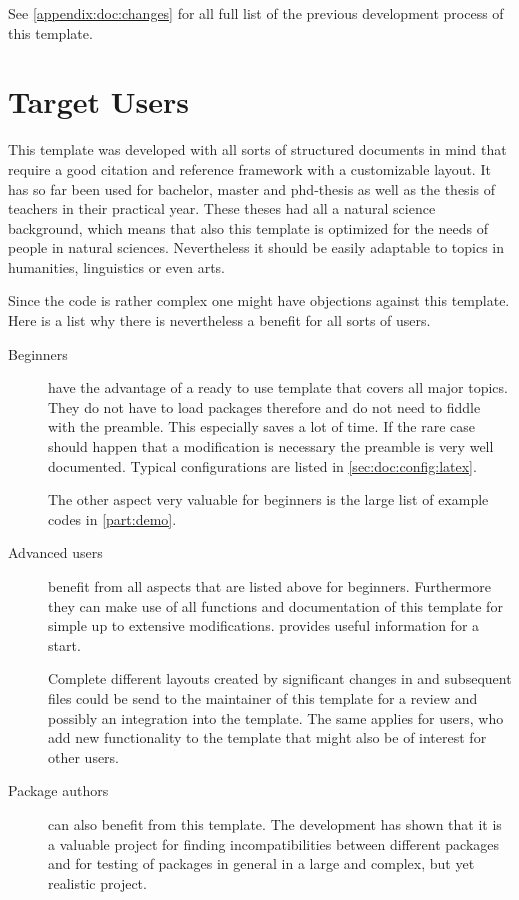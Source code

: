 See \cref{appendix:doc:changes} for all full list of the previous development process of this template.
\section{Target Users}
\label{sec:doc:targetusers}

This template was developed with all sorts of structured documents in mind that require a good citation and reference framework with a customizable layout. It has so far been used for bachelor, master and phd-thesis as well as the thesis of teachers in their practical year. These theses had all a natural science background, which means that also this template is optimized for the needs of people in natural sciences. Nevertheless it should be easily adaptable to topics in humanities, linguistics or even arts.

Since the code is rather complex one might have objections against this template. Here is a list why there is nevertheless a benefit for all sorts of users.

\begin{description}
\item[Beginners] have the advantage of a ready to use template that covers all major topics. They do not have to load packages therefore and do not need to fiddle with the preamble. This especially saves a lot of time. If the rare case should happen that a modification is necessary the preamble is very well documented. Typical configurations are listed in \cref{sec:doc:config:latex}.

The other aspect very valuable for beginners is the large list of example codes in \cref{part:demo}. 
%
\item[Advanced \latex users] benefit from all aspects that are listed above for beginners. Furthermore they can make use of all functions and documentation of this template for simple up to extensive modifications.  provides useful information for a start.

Complete different layouts created by significant changes in  and subsequent files could be send to the maintainer of this template for a review and possibly an integration into the template. The same applies for users, who add new functionality to the template that might also be of interest for other users.
%
\item[Package authors] can also benefit from this template. The development has shown that it is a valuable project for finding incompatibilities between different packages and for testing of packages in general in a large and complex, but yet realistic project. 
\end{description}

